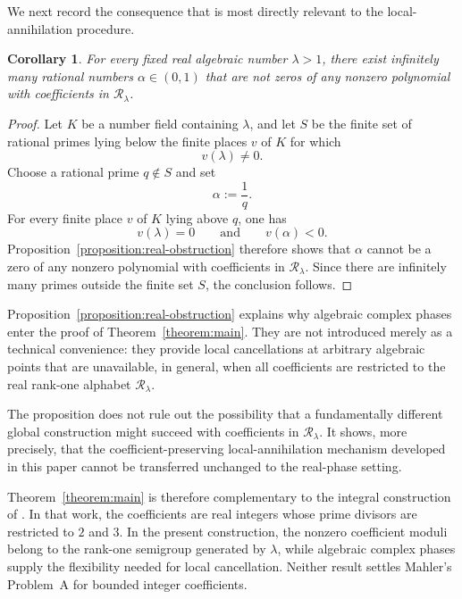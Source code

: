 \documentclass[10pt]{amsart}
\newtheorem{corollary}[theorem]{Corollary}
\theoremstyle{definition}
\theoremstyle{remark}
\numberwithin{equation}{section}
\newcommand{\Rset}{\mathcal R}
\begin{document}
We next record the consequence that is most directly relevant to the
local-annihilation procedure.

\begin{corollary}\label{corollary:infinitely-many-obstructed-points}
For every fixed real algebraic number $\lambda>1$, there exist infinitely
many rational numbers $\alpha\in(0,1)$ that are not zeros of any nonzero
polynomial with coefficients in $\Rset_\lambda$.
\end{corollary}

\begin{proof}
Let $K$ be a number field containing $\lambda$, and let $S$ be the finite
set of rational primes lying below the finite places $v$ of $K$ for which
\[
        v(\lambda)\neq0.
\]
Choose a rational prime $q\notin S$ and set
\[
        \alpha:=\frac1q.
\]
For every finite place $v$ of $K$ lying above $q$, one has
\[
        v(\lambda)=0
        \qquad\text{and}\qquad
        v(\alpha)<0.
\]
Proposition~\ref{proposition:real-obstruction} therefore shows that
$\alpha$ cannot be a zero of any nonzero polynomial with coefficients in
$\Rset_\lambda$. Since there are infinitely many primes outside the finite
set $S$, the conclusion follows.
\end{proof}

Proposition~\ref{proposition:real-obstruction} explains why algebraic
complex phases enter the proof of Theorem~\ref{theorem:main}. They are not
introduced merely as a technical convenience: they provide local
cancellations at arbitrary algebraic points that are unavailable, in
general, when all coefficients are restricted to the real rank-one alphabet
$\Rset_\lambda$.

The proposition does not rule out the possibility that a fundamentally
different global construction might succeed with coefficients in
$\Rset_\lambda$. It shows, more precisely, that the coefficient-preserving
local-annihilation mechanism developed in this paper cannot be transferred
unchanged to the real-phase setting.

Theorem~\ref{theorem:main} is therefore complementary to the integral
construction of \cite{marquesmoreira2021}. In that work, the coefficients
are real integers whose prime divisors are restricted to $2$ and $3$. In
the present construction, the nonzero coefficient moduli belong to the
rank-one semigroup generated by $\lambda$, while algebraic complex phases
supply the flexibility needed for local cancellation. Neither result
settles Mahler's Problem~A for bounded integer coefficients.
\end{document}
